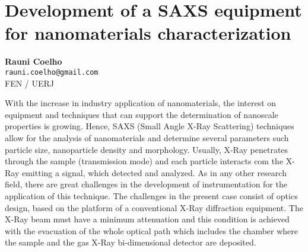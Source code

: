 
\section{Development of a SAXS equipment for nanomaterials characterization}

\textbf{Rauni Coelho}\\
\texttt{\small{rauni.coelho@gmail.com}}\\
FEN / UERJ

With the increase in industry application of nanomaterials, the interest on equipment and techniques that can support the determination of nanoscale properties is growing. Hence, SAXS (Small Angle X-Ray Scattering) techniques allow for the analysis of nanomaterials and determine several parameters such particle size, nanoparticle density and morphology. Usually, X-Ray penetrates through the sample (transmission mode) and each particle interacts com the X-Ray emitting a signal, which detected and analyzed. As in any other research field, there are great challenges in the development of instrumentation for the application of this technique. The challenges in the present case consist of optics design, based on the platform of a conventional X-Ray diffraction equipment. The X-Ray beam must have a minimum attenuation and this condition is achieved with the evacuation of the whole optical path which includes the chamber where the sample and the gas X-Ray bi-dimensional detector are deposited.

